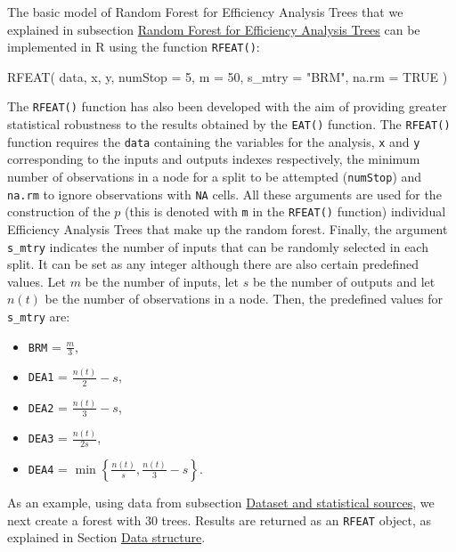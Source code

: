 The basic model of Random Forest for Efficiency Analysis Trees that we
explained in subsection \protect\hyperlink{section2.2}{Random Forest for
Efficiency Analysis Trees} can be implemented in R using the function
\texttt{RFEAT()}:

\begin{Schunk}
\begin{Sinput}
RFEAT(
  data, x, y,
  numStop = 5,
  m = 50,
  s_mtry = "BRM",
  na.rm = TRUE
)
\end{Sinput}
\end{Schunk}

The \texttt{RFEAT()} function has also been developed with the aim of
providing greater statistical robustness to the results obtained by the
\texttt{EAT()} function. The \texttt{RFEAT()} function requires the
\texttt{data} containing the variables for the analysis, \texttt{x} and
\texttt{y} corresponding to the inputs and outputs indexes respectively,
the minimum number of observations in a node for a split to be attempted
(\texttt{numStop}) and \texttt{na.rm} to ignore observations with
\texttt{NA} cells. All these arguments are used for the construction of
the \(p\) (this is denoted with \texttt{m} in the \texttt{RFEAT()}
function) individual Efficiency Analysis Trees that make up the random
forest. Finally, the argument \texttt{s\_mtry} indicates the number of
inputs that can be randomly selected in each split. It can be set as any
integer although there are also certain predefined values. Let \(m\) be
the number of inputs, let \(s\) be the number of outputs and let
\(n(t)\) be the number of observations in a node. Then, the predefined
values for \texttt{s\_mtry} are:

\begin{itemize}
\item
  \texttt{BRM} = \(\frac{m}{3}\),
\item
  \texttt{DEA1} = \(\frac{n\left(t\right)}{2}-s\),
\item
  \texttt{DEA2} = \(\frac{n\left(t\right)}{3}-s\),
\item
  \texttt{DEA3} = \(\frac{n\left(t\right)}{2s}\),
\item
  \texttt{DEA4} =
  \(\min \left\{\frac{n\left(t\right)}{s}, \frac{n\left(t\right)}{3}-s \right\}\).
\end{itemize}

As an example, using data from subsection
\protect\hyperlink{section3.1}{Dataset and statistical sources}, we next
create a forest with 30 trees. Results are returned as an \texttt{RFEAT}
object, as explained in Section \protect\hyperlink{section3}{Data
structure}.


